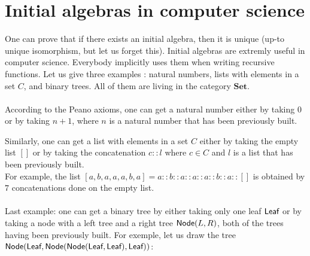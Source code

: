 \documentclass[11pt,a4paper]{article}
\newcommand{\gr}{\textbf}
\newcommand{\info}[1]{\text{{\fontfamily{lmss}\selectfont #1}}}
\newcommand{\1}{\mathbbm{1}}
\newcommand{\Leaf}{\info{Leaf}}
\newcommand{\Node}{\info{Node}}
\begin{document}
\section{Initial algebras in computer science}
One can prove that if there exists an initial algebra, then it is unique (up-to unique isomorphism, but let us forget this). Initial algebras are extremly useful in computer science. Everybody implicitly uses them when writing recursive functions. Let us give three examples : natural numbers, lists with elements in a set $C$, and binary trees. All of them are living in the category $\gr{Set}$.\\\\
According to the Peano axioms, one can get a natural number either by taking $0$ or by taking $n+1$, where $n$ is a natural number that has been previously built.
\begin{center}
\end{center}
Similarly, one can get a list with elements in a set $C$ either by taking the empty list $[]$ or by taking the concatenation $c::l$ where $c \in C$ and $l$ is a list that has been previously built.\\
For example, the list $[a,b,a,a,a,b,a] = a::b::a::a::a::b::a::[]$ is obtained by $7$ concatenations done on the empty list.\\\\
Last example: one can get a binary tree by either taking only one leaf $\Leaf$ or by taking a node with a left tree and a right tree $\Node(L,R)$, both of the trees having been previously built.
For exemple, let us draw the tree $\Node(\Leaf,\Node(\Node(\Leaf,\Leaf),\Leaf))$: 
\begin{center}
\end{center}
\end{document}
